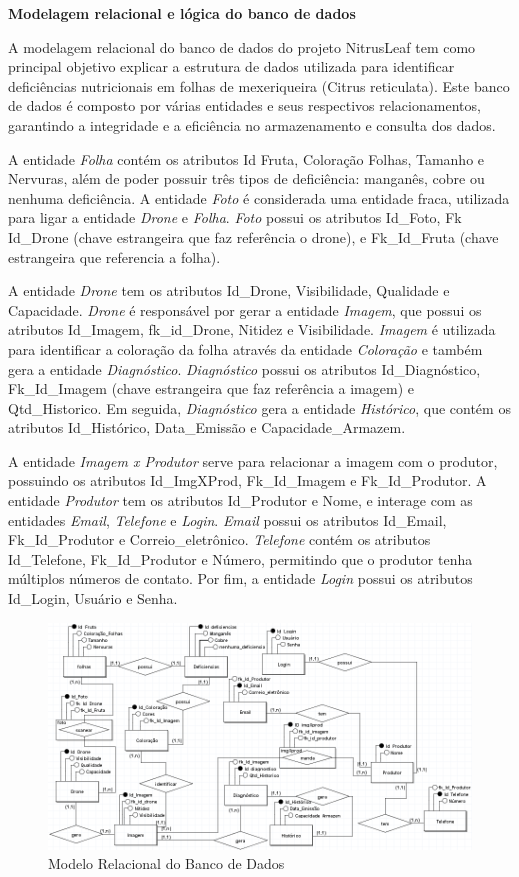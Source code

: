 \documentclass[
  a4paper,%
  12pt,%
  english,%
  brazilian,%
]{article}
\begin{document}
\textbf{Modelagem relacional e lógica do banco de dados}

A modelagem relacional do banco de dados  do projeto NitrusLeaf tem como principal objetivo explicar a estrutura de dados utilizada para identificar deficiências nutricionais em folhas de mexeriqueira (Citrus reticulata). Este banco de dados é composto por várias entidades e seus respectivos relacionamentos, garantindo a integridade e a eficiência no armazenamento e consulta dos dados.

A entidade \textit{Folha} contém os atributos Id Fruta, Coloração Folhas, Tamanho e Nervuras, além de poder possuir três tipos de deficiência: manganês, cobre ou nenhuma deficiência. A entidade \textit{Foto} é considerada uma entidade fraca, utilizada para ligar a entidade \textit{Drone} e \textit{Folha}. \textit{Foto} possui os atributos Id\_Foto, Fk Id\_Drone (chave estrangeira que faz referência o drone), e Fk\_Id\_Fruta (chave estrangeira que referencia a folha).

A entidade \textit{Drone} tem os atributos Id\_Drone, Visibilidade, Qualidade e Capacidade. \textit{Drone} é responsável por gerar a entidade \textit{Imagem}, que possui os atributos Id\_Imagem, fk\_id\_Drone, Nitidez e Visibilidade. \textit{Imagem} é utilizada para identificar a coloração da folha através da entidade \textit{Coloração} e também gera a entidade \textit{Diagnóstico}. \textit{Diagnóstico} possui os atributos Id\_Diagnóstico, Fk\_Id\_Imagem (chave estrangeira que faz referência a imagem) e Qtd\_Historico. Em seguida, \textit{Diagnóstico} gera a entidade \textit{Histórico}, que contém os atributos Id\_Histórico, Data\_Emissão e Capacidade\_Armazem.

A entidade \textit{Imagem x Produtor} serve para relacionar a imagem com o produtor, possuindo os atributos Id\_ImgXProd, Fk\_Id\_Imagem e Fk\_Id\_Produtor. A entidade \textit{Produtor} tem os atributos Id\_Produtor e Nome, e interage com as entidades \textit{Email}, \textit{Telefone} e \textit{Login}. \textit{Email} possui os atributos Id\_Email, Fk\_Id\_Produtor e Correio\_eletrônico. \textit{Telefone} contém os atributos Id\_Telefone, Fk\_Id\_Produtor e Número, permitindo que o produtor tenha múltiplos números de contato. Por fim, a entidade \textit{Login} possui os atributos Id\_Login, Usuário e Senha.

\begin{figure}[H]
    \centering
    \caption{Modelo Relacional do Banco de Dados}%
    \label{fig:mbdrelacional}
    \includegraphics[width=0.8\linewidth]{Logos/mbdrelacional.png}
    \end{figure}
\end{document}
